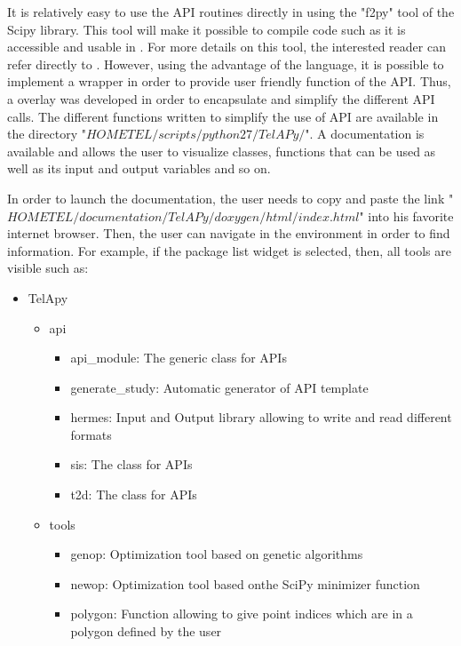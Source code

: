 It is relatively easy to use the \fortran API routines directly in \python using
the "f2py" tool of the \python Scipy library. This tool will make it possible
to compile \fortran code such as it is accessible and usable in \python. For more
details on this tool, the interested reader can refer directly to
\cite{Peterson2009}. However, using the advantage of the \python language, it
is possible to implement a wrapper in order to provide user friendly function
of the \fortran API. Thus, a \python overlay was developed in order to
encapsulate and simplify the different API \python calls. The different \python
functions written to simplify the use of API are available in the directory
"$HOMETEL/scripts/python27/TelAPy/$".
A \doxygen documentation is available and allows the user to visualize \python
classes, functions that can be used as well as its input and output variables
and so on.

In order to launch the \doxygen documentation, the user needs to copy and paste
the link "$HOME$\-$TEL/documentation/TelAPy/doxygen/html/index.html$" into his
favorite internet browser. Then, the user can navigate in the \doxygen
environment in order to find information. For example, if the package list
widget is selected, then, all \python tools are visible such as:

\begin{itemize}
\item TelApy
\begin{itemize}
\item api
\begin{itemize}
\item api\_module: The generic \python class for \telemacsystem APIs
\item generate\_study: Automatic generator of \telemacsystem API template \python
\item hermes: Input and Output library allowing to write and read different
  \telemacsystem formats
\item sis: The \sisyphe \python class for APIs
\item t2d: The  \python class for APIs
\end{itemize}
\end{itemize}
\begin{itemize}
\item tools
\begin{itemize}
\item genop: Optimization tool based on genetic algorithms
\item newop: Optimization tool based onthe SciPy minimizer function
\item polygon: Function allowing to give point indices which are in a polygon
  defined by the user
\end{itemize}
\end{itemize}
\end{itemize}

